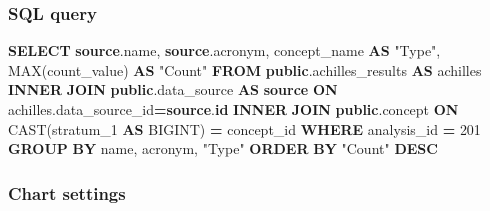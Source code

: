 \documentclass[
]{book}
\newenvironment{Shaded}{\begin{snugshade}}{\end{snugshade}}
\newcommand{\DecValTok}[1]{\textcolor[rgb]{0.00,0.00,0.81}{#1}}
\newcommand{\FunctionTok}[1]{\textcolor[rgb]{0.00,0.00,0.00}{#1}}
\newcommand{\KeywordTok}[1]{\textcolor[rgb]{0.13,0.29,0.53}{\textbf{#1}}}
\newcommand{\NormalTok}[1]{#1}
\newcommand{\OperatorTok}[1]{\textcolor[rgb]{0.81,0.36,0.00}{\textbf{#1}}}
\newcommand{\OtherTok}[1]{\textcolor[rgb]{0.56,0.35,0.01}{#1}}
\begin{document}
\hypertarget{sql-query-16}{%
\subsubsection*{SQL query}\label{sql-query-16}}

\begin{Shaded}
\begin{Highlighting}[]
\KeywordTok{SELECT} \KeywordTok{source}\NormalTok{.name,}
       \KeywordTok{source}\NormalTok{.acronym,}
\NormalTok{       concept\_name }\KeywordTok{AS} \OtherTok{"Type"}\NormalTok{,}
       \FunctionTok{MAX}\NormalTok{(count\_value) }\KeywordTok{AS} \OtherTok{"Count"}
\KeywordTok{FROM} \KeywordTok{public}\NormalTok{.achilles\_results }\KeywordTok{AS}\NormalTok{ achilles}
\KeywordTok{INNER} \KeywordTok{JOIN} \KeywordTok{public}\NormalTok{.data\_source }\KeywordTok{AS} \KeywordTok{source}
  \KeywordTok{ON}\NormalTok{ achilles.data\_source\_id}\OperatorTok{=}\KeywordTok{source}\NormalTok{.}\KeywordTok{id}
\KeywordTok{INNER} \KeywordTok{JOIN} \KeywordTok{public}\NormalTok{.concept}
  \KeywordTok{ON} \FunctionTok{CAST}\NormalTok{(stratum\_1 }\KeywordTok{AS}\NormalTok{ BIGINT) }\OperatorTok{=}\NormalTok{ concept\_id}
\KeywordTok{WHERE}\NormalTok{ analysis\_id }\OperatorTok{=} \DecValTok{201}
\KeywordTok{GROUP} \KeywordTok{BY}\NormalTok{ name, acronym, }\OtherTok{"Type"}
\KeywordTok{ORDER} \KeywordTok{BY} \OtherTok{"Count"} \KeywordTok{DESC}
\end{Highlighting}
\end{Shaded}

\hypertarget{chart-settings-17}{%
\subsubsection*{Chart settings}\label{chart-settings-17}}
\end{document}
